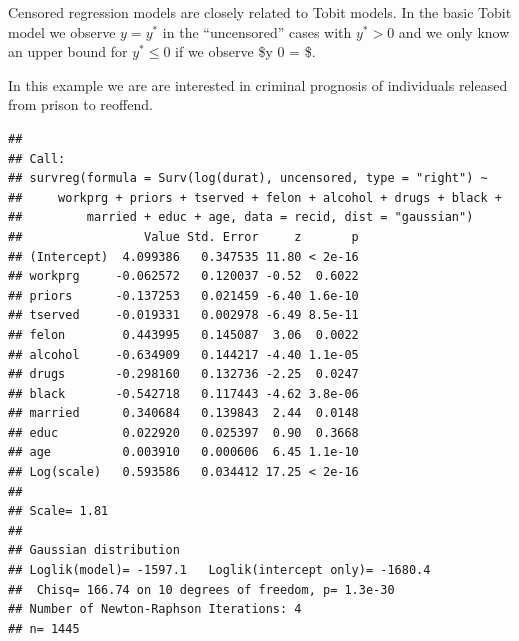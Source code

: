\documentclass[]{book}
\newenvironment{Shaded}{\begin{snugshade}}{\end{snugshade}}
\newcommand{\CommentTok}[1]{\textcolor[rgb]{0.56,0.35,0.01}{\textit{#1}}}
\newcommand{\DataTypeTok}[1]{\textcolor[rgb]{0.13,0.29,0.53}{#1}}
\newcommand{\DecValTok}[1]{\textcolor[rgb]{0.00,0.00,0.81}{#1}}
\newcommand{\KeywordTok}[1]{\textcolor[rgb]{0.13,0.29,0.53}{\textbf{#1}}}
\newcommand{\NormalTok}[1]{#1}
\newcommand{\OperatorTok}[1]{\textcolor[rgb]{0.81,0.36,0.00}{\textbf{#1}}}
\newcommand{\StringTok}[1]{\textcolor[rgb]{0.31,0.60,0.02}{#1}}
\begin{document}
Censored regression models are closely related to Tobit models. In the
basic Tobit model we observe \(y = y^*\) in the ``uncensored'' cases
with \(y^* > 0\) and we only know an upper bound for \(y^* \le 0\) if we
observe \$y 0 = \$.

In this example we are are interested in criminal prognosis of
individuals released from prison to reoffend.

\begin{Shaded}
\end{Shaded}

\begin{verbatim}
## 
## Call:
## survreg(formula = Surv(log(durat), uncensored, type = "right") ~ 
##     workprg + priors + tserved + felon + alcohol + drugs + black + 
##         married + educ + age, data = recid, dist = "gaussian")
##                 Value Std. Error     z       p
## (Intercept)  4.099386   0.347535 11.80 < 2e-16
## workprg     -0.062572   0.120037 -0.52  0.6022
## priors      -0.137253   0.021459 -6.40 1.6e-10
## tserved     -0.019331   0.002978 -6.49 8.5e-11
## felon        0.443995   0.145087  3.06  0.0022
## alcohol     -0.634909   0.144217 -4.40 1.1e-05
## drugs       -0.298160   0.132736 -2.25  0.0247
## black       -0.542718   0.117443 -4.62 3.8e-06
## married      0.340684   0.139843  2.44  0.0148
## educ         0.022920   0.025397  0.90  0.3668
## age          0.003910   0.000606  6.45 1.1e-10
## Log(scale)   0.593586   0.034412 17.25 < 2e-16
## 
## Scale= 1.81 
## 
## Gaussian distribution
## Loglik(model)= -1597.1   Loglik(intercept only)= -1680.4
##  Chisq= 166.74 on 10 degrees of freedom, p= 1.3e-30 
## Number of Newton-Raphson Iterations: 4 
## n= 1445
\end{verbatim}
\end{document}
